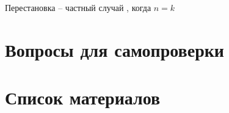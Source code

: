 \begin{frame}{Перестановка}
 -- 
частный случай , 
когда $n=k$ 
\end{frame}


\section{Вопросы для самопроверки}


\section{Список материалов}


  
